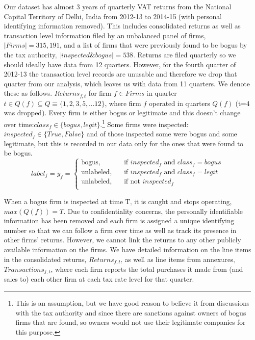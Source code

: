 Our dataset has almost 3 years of quarterly VAT returns from the National Capital Territory of Delhi, India from 2012-13 to 2014-15 (with personal identifying information removed). This includes consolidated returns as well as transaction level information filed by an unbalanced panel of firms, $|Firms|=315,191$, and a list of firms that were previously found to be bogus by the tax authority, $|inspected \& bogus|=538$.  Returns are filed quarterly so we should ideally have data from 12 quarters. However, for the fourth quarter of 2012-13 the transaction level records are unusable and therefore we drop that quarter from our analysis, which leaves us with data from 11 quarters. We denote these as follows. $Returns_{f,t}$ for firm $f\in Firms$ in quarter $t \in Q(f)\subseteq Q \equiv \{1,2,3,5,...12\}$, where firm $f$ operated in quarters $Q(f)$ (t=4 was dropped). Every firm is either bogus or legitimate and this doesn't change over time:$class_f \in \{bogus,legit\}$.\footnote{This is an assumption, but we have good reason to believe it from discussions with the tax authority and since there are sanctions against owners of bogus firms that are found, so owners would not use their legitimate companies for this purpose.} Some firms were inspected: $inspected_f \in \{True,False\}$ and of those inspected some were bogus and some legitimate, but this is recorded in our data only for the ones that were found to be bogus.\[ label_f =y_f= 
     \begin{cases}
       \text{bogus,} &\quad\text{if $inspected_f$ and $class_f=bogus$} \\
       \text{unlabeled,} &\quad\text{if $inspected_f$ and $class_f=legit$} \\
       \text{unlabeled,} &\quad\text{if not $inspected_f$} \\
     \end{cases}
\]

When a bogus firm is inspected at time T, it is caught and stops operating, $max(Q(f))=T$. Due to confidentiality concerns, the personally identifiable information has been removed and each firm is assigned a unique identifying number so that we can follow a firm over time as well as track its presence in other firms' returns. However, we cannot link the returns to any other publicly available information on the firms. We have detailed information on the line items in the consolidated returns, $Returns_{f,t}$, as well as line items from annexures, $Transactions_{f,t}$, where each firm reports the total purchases it made from (and sales to) each other firm at each tax rate level for that quarter. 

